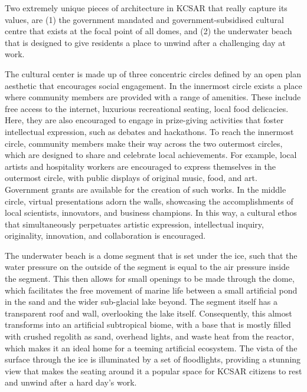 \documentclass[fleqn,10pt]{Stylesheet} %
\begin{document}
Two extremely unique pieces of architecture in KCSAR that really capture its values, are (1) the government mandated and government-subsidised cultural centre that exists at the focal point of all domes, and (2) the underwater beach that is designed to give residents a place to unwind after a challenging day at work. 

The cultural center is made up of three concentric circles defined by an open plan aesthetic that encourages social engagement. In the innermost circle exists a place where community members are provided with a range of amenities. These include free access to the internet, luxurious recreational seating, local food delicacies. Here, they are also encouraged to engage in prize-giving activities that foster intellectual expression, such as debates and hackathons. To reach the innermost circle, community members make their way across the two outermost circles, which are designed to share and celebrate local achievements. For example, local artists and hospitality workers are encouraged to express themselves in the outermost circle, with public displays of original music, food, and art. Government grants are available for the creation of such works. In the middle circle, virtual presentations adorn the walls, showcasing the accomplishments of local scientists, innovators, and business champions. In this way, a cultural ethos that simultaneously perpetuates artistic expression, intellectual inquiry, originality, innovation, and collaboration is encouraged. 

The underwater beach is a dome segment that is set under the ice, such that the water pressure on the outside of the segment is equal to the air pressure inside the segment. This then allows for small openings to be made through the dome, which facilitates the free movement of marine life between a small artificial pond in the sand and the wider sub-glacial lake beyond. The segment itself has a transparent roof and wall, overlooking the lake itself. Consequently, this almost transforms into an artificial subtropical biome, with a base that is mostly filled with crushed regolith as sand, overhead lights, and waste heat from the reactor, which makes it an ideal home for a teeming artificial ecosystem. The vista of the surface through the ice is illuminated by a set of floodlights, providing a stunning view that makes the seating around it a popular space for KCSAR citizens to rest and unwind after a hard day's work.
\end{document}
